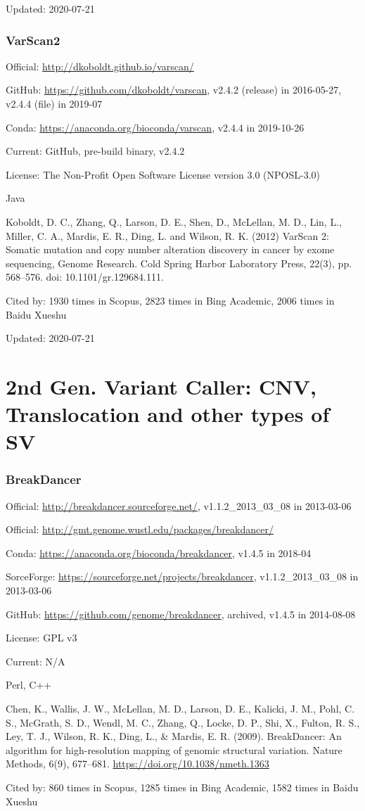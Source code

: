 \documentclass[]{article}
\newcommand{\cb}[3]{\par Cited by: {\color{blue}\Huge #1} times in Scopus, {\color{blue}\Huge #2} times in Bing Academic, {\color{blue}\Huge #3} times in Baidu Xueshu}
\begin{document}
Updated: 2020-07-21

\section{VarScan2}

Official: \url{http://dkoboldt.github.io/varscan/}

GitHub: \url{https://github.com/dkoboldt/varscan}, v2.4.2 (release) in 2016-05-27, v2.4.4 (file) in 2019-07

Conda: \url{https://anaconda.org/bioconda/varscan}, v2.4.4 in 2019-10-26

Current: GitHub, pre-build binary, v2.4.2

License: The Non-Profit Open Software License version 3.0 (NPOSL-3.0)

Java

Koboldt, D. C., Zhang, Q., Larson, D. E., Shen, D., McLellan, M. D., Lin, L., Miller, C. A., Mardis, E. R., Ding, L. and Wilson, R. K. (2012) VarScan 2: Somatic mutation and copy number alteration discovery in cancer by exome sequencing, Genome Research. Cold Spring Harbor Laboratory Press, 22(3), pp. 568–576. doi: 10.1101/gr.129684.111.\cb{1930}{2823}{2006}

Updated: 2020-07-21

\part{2nd Gen. Variant Caller: CNV, Translocation and other types of SV}
\section{BreakDancer}

Official: \url{http://breakdancer.sourceforge.net/}, v1.1.2\_2013\_03\_08 in 2013-03-06

Official: \url{http://gmt.genome.wustl.edu/packages/breakdancer/}

Conda: \url{https://anaconda.org/bioconda/breakdancer}, v1.4.5 in 2018-04

SorceForge: \url{https://sourceforge.net/projects/breakdancer}, v1.1.2\_2013\_03\_08 in 2013-03-06

GitHub: \url{https://github.com/genome/breakdancer}, archived, v1.4.5 in 2014-08-08

License: GPL v3

Current: N/A

Perl, C++

Chen, K., Wallis, J. W., McLellan, M. D., Larson, D. E., Kalicki, J. M., Pohl, C. S., McGrath, S. D., Wendl, M. C., Zhang, Q., Locke, D. P., Shi, X., Fulton, R. S., Ley, T. J., Wilson, R. K., Ding, L., \& Mardis, E. R. (2009). BreakDancer: An algorithm for high-resolution mapping of genomic structural variation. Nature Methods, 6(9), 677–681. \url{https://doi.org/10.1038/nmeth.1363}\cb{860}{1285}{1582}
\end{document}
